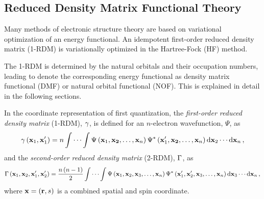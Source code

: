 \subsection{Reduced Density Matrix Functional Theory} %

Many methods of electronic structure theory are based on variational
optimization of an energy functional.
An idempotent first-order reduced density matrix (1-RDM) is variationally
optimized in the Hartree-Fock (HF) method.

The 1-RDM is determined by the natural orbitals and their occupation
numbers, leading to denote the corresponding energy
functional as density matrix functional (DMF) or natural orbital functional (NOF).
This is explained in detail in the following sections.


In the coordinate representation of first quantization,
the \textit{first-order reduced density matrix} (1-RDM), $\gamma$, is defined
for an $n$-electron wavefunction, $\Psi$, as
\begin{equation} \label{eq:fordm-coordinate-representation}
    \gamma \left( \boldsymbol{\mathrm{x}}_1, \boldsymbol{\mathrm{x}}_1^{\prime} \right) =
    n \idotsint
    \Psi \left( \boldsymbol{\mathrm{x}}_1, \boldsymbol{\mathrm{x_2}}, \ldots,  \boldsymbol{\mathrm{x}}_n \right)
    \Psi^{*} \left( \boldsymbol{\mathrm{x}}_1^{\prime}, \boldsymbol{\mathrm{x_2}}, \ldots,  \boldsymbol{\mathrm{x}}_n \right)
    \dd{ \boldsymbol{\mathrm{x}}_2} \cdots \dd{ \boldsymbol{\mathrm{x}}_n}
    ,
\end{equation}
and the \textit{second-order reduced density matrix} (2-RDM), $\Gamma$, as 
\begin{equation} \label{eq:sordm-coordinate-representation}
    \Gamma \left( \boldsymbol{\mathrm{x}}_1, \boldsymbol{\mathrm{x}}_2, \boldsymbol{\mathrm{x}}_1^{\prime}, \boldsymbol{\mathrm{x}}_2^{\prime} \right)
    =
    \frac{n\left( n - 1 \right)}{2} \idotsint
    \Psi \left( \boldsymbol{\mathrm{x}}_1, \boldsymbol{\mathrm{x}}_2, \boldsymbol{\mathrm{x}}_3, \ldots,  \boldsymbol{\mathrm{x}}_n \right)
    \Psi^{*} \left( \boldsymbol{\mathrm{x}}_1^{\prime}, \boldsymbol{\mathrm{x}}_2^{\prime}, \boldsymbol{\mathrm{x}}_3, \ldots,  \boldsymbol{\mathrm{x}}_n \right)
    \dd{ \boldsymbol{\mathrm{x}}_3} \cdots \dd{ \boldsymbol{\mathrm{x}}_n}
    ,
\end{equation}
where $ \boldsymbol{\mathrm{x}} = \left( \boldsymbol{\mathrm{r}}, s \right)$ is a combined spatial and spin
coordinate.


